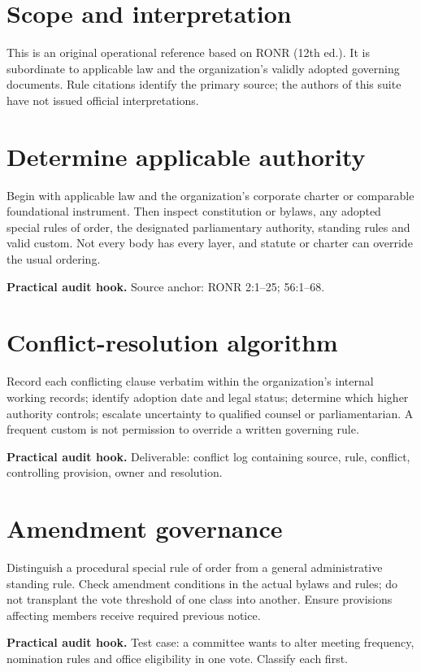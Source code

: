 \documentclass[11pt]{article}
\begin{document}
\SuiteOpen
\section{Scope and interpretation}
This is an original operational reference based on RONR (12th ed.). It is subordinate to applicable law and the organization’s validly adopted governing documents. Rule citations identify the primary source; the authors of this suite have not issued official interpretations.

\section{Determine applicable authority}
Begin with applicable law and the organization’s corporate charter or comparable foundational instrument. Then inspect constitution or bylaws, any adopted special rules of order, the designated parliamentary authority, standing rules and valid custom. Not every body has every layer, and statute or charter can override the usual ordering.

\textbf{Practical audit hook.} Source anchor: RONR 2:1--25; 56:1--68.

\section{Conflict-resolution algorithm}
Record each conflicting clause verbatim within the organization’s internal working records; identify adoption date and legal status; determine which higher authority controls; escalate uncertainty to qualified counsel or parliamentarian. A frequent custom is not permission to override a written governing rule.

\textbf{Practical audit hook.} Deliverable: conflict log containing source, rule, conflict, controlling provision, owner and resolution.

\section{Amendment governance}
Distinguish a procedural special rule of order from a general administrative standing rule. Check amendment conditions in the actual bylaws and rules; do not transplant the vote threshold of one class into another. Ensure provisions affecting members receive required previous notice.

\textbf{Practical audit hook.} Test case: a committee wants to alter meeting frequency, nomination rules and office eligibility in one vote. Classify each first.
\end{document}
